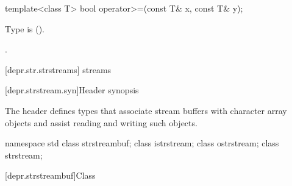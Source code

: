 %
\begin{itemdecl}
template<class T> bool operator>=(const T& x, const T& y);
\end{itemdecl}

\begin{itemdescr}
\pnum
\requires
Type  is  ().

\pnum
\returns
{}.
\end{itemdescr}

[depr.str.strstreams]{ streams}

[depr.strstream.syn]{Header  synopsis}

\pnum
The header 
defines types that associate stream buffers with
character array objects and assist reading and writing such objects.

\begin{codeblock}
namespace std {
  class strstreambuf;
  class istrstream;
  class ostrstream;
  class strstream;
}
\end{codeblock}

[depr.strstreambuf]{Class }

